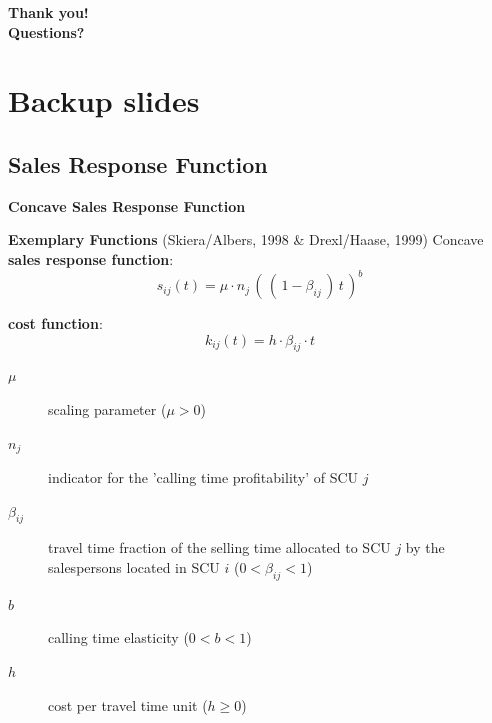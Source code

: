 \begin{frame}
\begin{center}
{\LARGE \textbf{Thank you!}} \\[1em]
{\LARGE \textbf{Questions?}}
\end{center}
\end{frame}

\section{Backup slides}
\subsection{Sales Response Function}
\begin{frame}
\begin{center}
{\LARGE \textbf{Concave Sales Response Function}}
\end{center}
\end{frame}
\begin{frame}{\textbf{Exemplary Functions} (Skiera/Albers, 1998 \& Drexl/Haase, 1999)}
Concave \textbf{sales response function}:
\begin{equation} \label{sfd-sales-response-function}
s_{ij}(t) = \mu \cdot n_j \, (\, (\, 1- \beta_{ij} \,)\, t\, ) ^ b 
\end{equation}

\textbf{cost function}:
\begin{equation} \label{sfd-cost-function}
k_{ij}(t) = h \cdot \beta_{ij} \cdot t
\end{equation}
\vfill
\begin{description}
    \item[$\mu$]  scaling parameter ($\mu > 0$)
     \item[$n_j$] indicator for the 'calling time profitability' of SCU $j$ 
     \item[$\beta_{ij}$] travel time fraction of the selling time allocated to SCU $j$ 
                    by the salespersons located in SCU $i$
                   ($0 < \beta_{ij} < 1$)
			\item[$b$] calling time elasticity ($0< b < 1$)						
     \item[$h$]     cost per travel time unit ($h \ge 0$)
		\end{description}
\end{frame}

